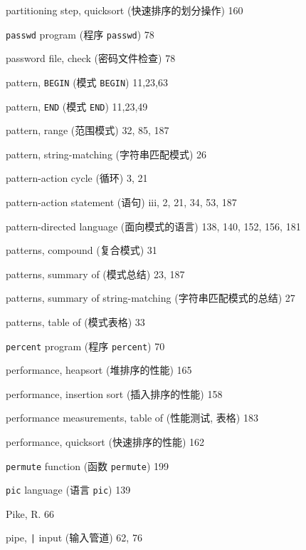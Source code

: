 \begin{multicols}{3}
\hangindent=3pc  partitioning step, quicksort
(快速排序的划分操作) 160

\hangindent=3pc  \verb'passwd' program (程序 \verb'passwd') 78

\hangindent=3pc  password file, check (密码文件检查) 78

\hangindent=3pc  pattern, \verb'BEGIN' (模式 \verb'BEGIN') 11,23,63

\hangindent=3pc  pattern, \verb'END' (模式 \verb'END') 11,23,49

\hangindent=3pc  pattern, range (范围模式) 32, 85, 187

\hangindent=3pc  pattern, string-matching (字符串匹配模式) 26

\hangindent=3pc  pattern-action cycle (\patact 循环) 3, 21

\hangindent=3pc  pattern-action statement (\patact 语句)
iii, 2, 21, 34, 53, 187

\hangindent=3pc  pattern-directed language (面向模式的语言)
138,  140, 152, 156, 181

\hangindent=3pc  patterns, compound (复合模式) 31

\hangindent=3pc  patterns, summary of (模式总结) 23, 187

\hangindent=3pc  patterns, summary of string-matching
(字符串匹配模式的总结) 27

\hangindent=3pc  patterns, table of (模式表格) 33

\hangindent=3pc  \verb'percent' program (程序 \verb'percent') 70

\hangindent=3pc  performance, heapsort (堆排序的性能) 165

\hangindent=3pc  performance, insertion sort (插入排序的性能) 158

\hangindent=3pc  performance measurements, table of (性能测试,
表格) 183

\hangindent=3pc  performance, quicksort (快速排序的性能) 162

\hangindent=3pc  \verb'permute' function (函数 \verb'permute') 199

\hangindent=3pc  \verb'pic' language (语言 \verb'pic') 139

\hangindent=3pc  Pike, R. 66

\hangindent=3pc  pipe, \verb'|' input (输入管道) 62, 76


\end{multicols}
